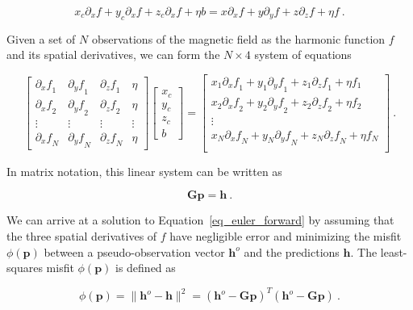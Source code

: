 \begin{equation}
x_c \partial_x f + y_c \partial_x f + z_c \partial_x f + \eta b
=
x \partial_x f + y \partial_y f + z \partial_z f + \eta f
\ .
\end{equation}

Given a set of $N$ observations of the magnetic field as the harmonic function $f$ and its spatial derivatives, we can form the $N \times 4$ system of equations

\begin{equation}
\begin{bmatrix}
  {\partial_x f}_1 & {\partial_y f}_1 & {\partial_z f}_1 & \eta \\
  {\partial_x f}_2 & {\partial_y f}_2 & {\partial_z f}_2 & \eta \\
  \vdots & \vdots & \vdots & \vdots \\
  {\partial_x f}_N & {\partial_y f}_N & {\partial_z f}_N & \eta
\end{bmatrix}
\begin{bmatrix}
  x_c \\ y_c \\ z_c \\ b
\end{bmatrix}
=
\begin{bmatrix}
  x_1 {\partial_x f}_1 + y_1 {\partial_y f}_1 + z_1 {\partial_z f}_1 + \eta f_1 \\
  x_2 {\partial_x f}_2 + y_2 {\partial_y f}_2 + z_2 {\partial_z f}_2 + \eta f_2 \\
  \vdots \\
  x_N {\partial_x f}_N + y_N {\partial_y f}_N + z_N {\partial_z f}_N + \eta f_N \\
\end{bmatrix}
\ .
\end{equation}

In matrix notation, this linear system can be written as

\begin{equation}
\label{eq_euler_forward}
\mathbf{G} \mathbf{p} = \mathbf{h} \ .
\end{equation}

We can arrive at a solution to Equation~\ref{eq_euler_forward} by assuming that the three spatial derivatives of $f$ have negligible error and minimizing the misfit $\phi(\mathbf{p})$ between a pseudo-observation vector $\mathbf{h}^o$ and the predictions $\mathbf{h}$. The least-squares misfit $\phi(\mathbf{p})$ is defined as

\begin{equation}
\label{ZTSuSBbL16}
\phi(\mathbf{p}) = \|\mathbf{h}^o - \mathbf{h}\|^2 = (\mathbf{h}^o - \mathbf{G}\mathbf{p})^T (\mathbf{h}^o - \mathbf{G}\mathbf{p})\ .
\end{equation}

